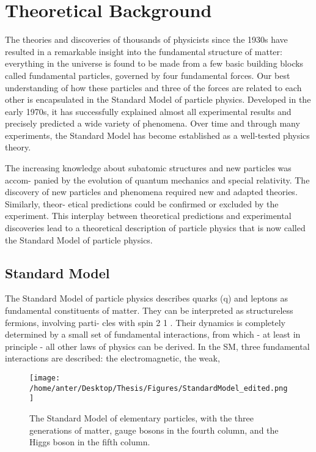 \chapter{Theoretical Background}
\label{chap:Theory}

The theories and discoveries of thousands of physicists since the 1930s have resulted in a remarkable insight into the fundamental structure of matter: everything in the universe is found to be made from a few basic building blocks called fundamental particles, governed by four fundamental forces. Our best understanding of how these particles and three of the forces are related to each other is encapsulated in the Standard Model of particle physics. Developed in the early 1970s, it has successfully explained almost all experimental results and precisely predicted a wide variety of phenomena. Over time and through many experiments, the Standard Model has become established as a well-tested physics theory.



The increasing knowledge about subatomic structures and new particles was accom-
panied by the evolution of quantum mechanics and special relativity. The discovery
of new particles and phenomena required new and adapted theories. Similarly, theor-
etical predictions could be confirmed or excluded by the experiment. This interplay
between theoretical predictions and experimental discoveries lead to a theoretical
description of particle physics that is now called the Standard Model of particle
physics.

\section{Standard Model}
The Standard Model of particle physics describes quarks (q) and leptons as fundamental
constituents of matter. They can be interpreted as structureless fermions, involving parti-
cles with spin 2 1 . Their dynamics is completely determined by a small set of fundamental
interactions, from which - at least in principle - all other laws of physics can be derived.
In the SM, three fundamental interactions are described: the electromagnetic, the weak,
\begin{figure}[!h]
\begin{center}
\vspace*{3mm} 
\hspace*{-5mm}
\texttt{[image: /home/anter/Desktop/Thesis/Figures/StandardModel\_edited.png]}\\
\vspace*{4mm}
\caption[Muon]{The Standard Model of elementary particles, with the three generations of matter, gauge bosons in the fourth column, and the Higgs boson in the fifth column\footnotemark.}
\label{fig:muon}
\end{center}
\end{figure}

